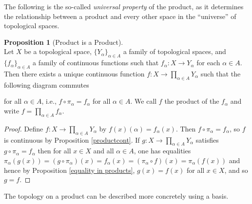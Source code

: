 \documentclass{book}
\theoremstyle{definition}
\newtheorem{proposition}{Proposition}[section]
\theoremstyle{remark}
\begin{document}
The following is the so-called \textit{universal property} of the product, as it determines the relationship between a product and every other space in the ``universe'' of topological spaces.

\begin{proposition}[Product is a Product]$ $\\
Let $X$ be a topological space, $\{Y_\alpha\}_{\alpha\in A}$ a family of topological spaces, and $\{f_\alpha\}_{\alpha\in A}$ a family of continuous functions such that $f_\alpha:X\to Y_\alpha$ for each $\alpha\in A$. Then there exists a unique continuous function $f:X\to\prod_{\alpha\in A}Y_\alpha$ such that the following diagram commutes
\begin{center}
\end{center}
for all $\alpha\in A$, i.e., $f\circ\pi_\alpha=f_\alpha$ for all $\alpha\in A$. We call $f$ the product of the $f_\alpha$ and write $f=\prod_{\alpha\in A}f_\alpha$.
\end{proposition}
\begin{proof}
Define $f:X\to\prod_{\alpha\in A}Y_\alpha$ by $f(x)(\alpha)=f_\alpha(x)$. Then $f\circ\pi_\alpha=f_\alpha$, so $f$ is continuous by Proposition \ref{productcont}. If $g:X\to\prod_{\alpha\in A}Y_\alpha$ satisfies $g\circ\pi_\alpha=f_\alpha$ then for all $x\in X$ and all $\alpha\in A$, one has equalities $\pi_\alpha(g(x))=(g\circ \pi_\alpha)(x)=f_\alpha(x)=(\pi_\alpha\circ f)(x)=\pi_\alpha(f(x))$ and hence by Proposition \ref{equality in products}, $g(x)=f(x)$ for all $x\in X$, and so $g=f$.
\end{proof}

The topology on a product can be described more concretely using a basis.
\end{document}
